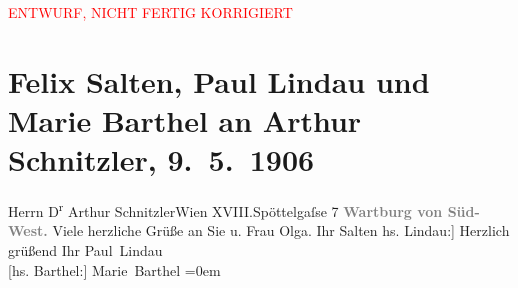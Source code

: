 
\begin{center}
            \textcolor{red}{ENTWURF, NICHT FERTIG KORRIGIERT}
                      \end{center}
            
         
         \renewcommand{\erwaehntePersonen}{Personen: Olga Schnitzler}
         \renewcommand{\erwaehnteOrte}{Orte: Edmund-Weiß-Gasse, Wartburg, Wien, XVIII., Währing}
         \renewcommand{\erwaehnteWerke}{}
               \section[Felix Salten, Paul Lindau und Marie Barthel an Arthur Schnitzler, 9. 5. 1906]{ Felix Salten, Paul Lindau und Marie Barthel an Arthur Schnitzler,
               9. 5. 1906}\nopagebreak{}\rehead{ }\begin{ledgroupsized}[t]{13cm}\normalsize\beginnumbering \toendnotes[C]{\smallbreak\pagebreak[2]} 
\pstart{}{\pb}Herrn D\textsuperscript{r} Arthur Schnitzler\pend{}\pstart{}Wien XVIII.\pend{}\pstart{}Spöttelgaſse 7\pend{}{\bigskip}\pstart
           \noindent{}\centering{}{\pb}\textcolor{gray}{\textbf{Wartburg von Süd-West.}}\pend
           \pstart
           Viele herzliche Grüße an Sie u. Frau Olga.\pend
           \pstart Ihr \spacefill\mbox{Salten}\pend{}\pstart
           \noindent{}{[}hs. Lindau:{]} Herzlich grüßend\pend
           \pstart
           Ihr \spacefill\mbox{Paul Lindau}{\\[\baselineskip]}{[}hs. Barthel:{]} \spacefill\mbox{Marie Barthel}\pend
           \leftskip=0em{}
         
         \endnumbering{}\end{ledgroupsized}\begin{anhang}\end{anhang}\newcommand{\dateiname}{L03423}\newcommand{\titel}{Felix Salten, Paul Lindau und Marie Barthel an Arthur Schnitzler, 9. 5. 1906}\newcommand{\editorInnen}{Martin Anton Müller und Laura Untner}
      